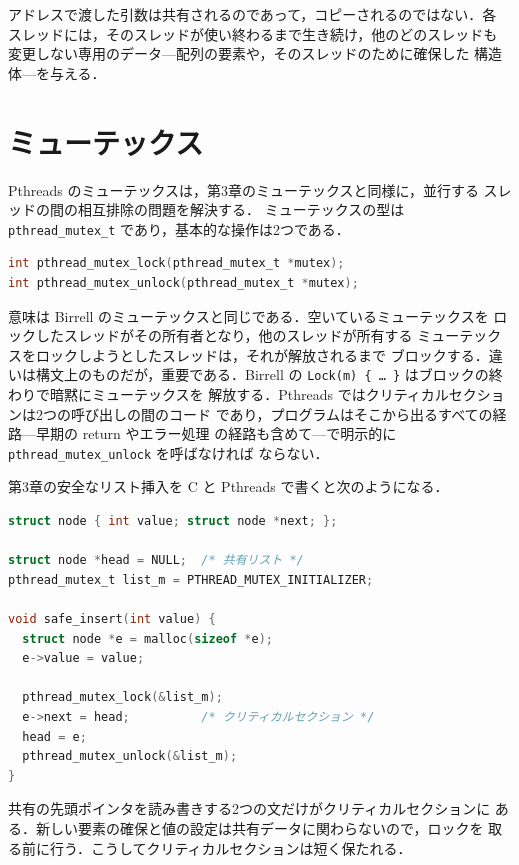 \documentclass[../main.tex]{subfiles}
\begin{document}
\begin{keypoint}
  アドレスで渡した引数は共有されるのであって，コピーされるのではない．各
  スレッドには，そのスレッドが使い終わるまで生き続け，他のどのスレッドも
  変更しない専用のデータ---配列の要素や，そのスレッドのために確保した
  構造体---を与える．
\end{keypoint}

\section{ミューテックス}
\label{sec:l04-mutex}

Pthreads のミューテックスは，第3章のミューテックスと同様に，並行する
スレッドの間の相互排除の問題を解決する．%
ミューテックスの型は
\texttt{pthread\_mutex\_t} であり，基本的な操作は2つである．
\begin{lstlisting}[language=C, numbers=none]
int pthread_mutex_lock(pthread_mutex_t *mutex);
int pthread_mutex_unlock(pthread_mutex_t *mutex);
\end{lstlisting}
意味は Birrell のミューテックスと同じである．空いているミューテックスを
ロックしたスレッドがその所有者となり，他のスレッドが所有する
ミューテックスをロックしようとしたスレッドは，それが解放されるまで
ブロックする．違いは構文上のものだが，重要である．Birrell の
\texttt{Lock(m)~\{\,\ldots\,\}} はブロックの終わりで暗黙にミューテックスを
解放する．Pthreads ではクリティカルセクションは2つの呼び出しの間のコード
であり，プログラムはそこから出るすべての経路---早期の return やエラー処理
の経路も含めて---で明示的に \texttt{pthread\_mutex\_unlock} を呼ばなければ
ならない．

\begin{example}
  \label{ex:l04-safe-insert}
  第3章の安全なリスト挿入を C と Pthreads で書くと次のようになる．
  \begin{lstlisting}[language=C, numbers=none]
struct node { int value; struct node *next; };

struct node *head = NULL;  /* 共有リスト */
pthread_mutex_t list_m = PTHREAD_MUTEX_INITIALIZER;

void safe_insert(int value) {
  struct node *e = malloc(sizeof *e);
  e->value = value;

  pthread_mutex_lock(&list_m);
  e->next = head;          /* クリティカルセクション */
  head = e;
  pthread_mutex_unlock(&list_m);
}
\end{lstlisting}
  共有の先頭ポインタを読み書きする2つの文だけがクリティカルセクションに
  ある．新しい要素の確保と値の設定は共有データに関わらないので，ロックを
  取る前に行う．こうしてクリティカルセクションは短く保たれる．
\end{example}
\end{document}
